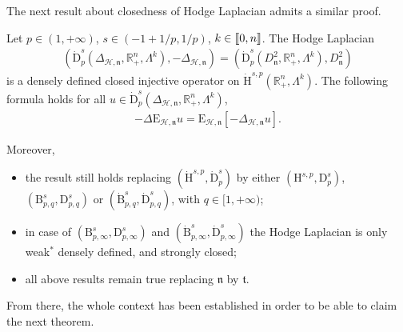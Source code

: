 \documentclass[AHL,Unicode,longabstracts,published]{cedram}
\newcommand{\bbR}{\mathbb{R}}
\newcommand{\rmH}{\mathrm{H}}%
\newcommand{\rmB}{\mathrm{B}}
\newcommand{\rmD}{\mathrm{D}}
\newcommand{\rmE}{\mathrm{E}}
\newcommand{\clH}{\mathcal{H}}
\newcommand{\fkn}{\mathfrak{n}}
\newcommand{\fkt}{\mathfrak{t}}
\newcommand{\llbracket}{\mathopen{[\mkern -2.7mu[}}
\newcommand{\rrbracket}{\mathclose{]\mkern -2.7mu]}}
\newcommand{\llb}{\llbracket}
\newcommand{\rrb}{\rrbracket}
\begin{document}
The next result about closedness of Hodge Laplacian admits a similar proof.

\begin{prop}\label{prop:ExtOpHodgeLapRn+}
Let $p\in(1,+\infty)$, $s\in(-1+1/p,1/p)$, $k\in\llb 0,n \rrb$. The Hodge Laplacian
\begin{align*}
\left(\dot{\rmD}^{s}_{p}\left(\Delta_{\clH,\fkn},\bbR^n_+,\Lambda^k\right),-\Delta_{\clH,\fkn}\right)=\left(\dot{\rmD}^{s}_{p}\left(D_\fkn^2,\bbR^n_+,\Lambda^k\right),D_\fkn^2\right)
\end{align*}
is a densely defined closed injective operator on $\dot{\rmH}^{s,p}(\bbR^n_+,\Lambda^k)$. The following formula holds for all $u\in \dot{\rmD}^{s}_{p}(\Delta_{\clH,\fkn},\bbR^n_+,\Lambda^k)$,
\begin{align*}
-\Delta \rmE _{\clH,\fkn} u = \rmE _{\clH,\fkn}\left[-\Delta_{\clH,\fkn} u\right].
\end{align*}

Moreover,
\begin{itemize}
\item the result still holds replacing $(\dot{\rmH}^{s,p},\dot{\rmD}^{s}_{p})$ by either $({\rmH}^{s,p},{\rmD}^{s}_{p})$, $(\rmB^{s}_{p,q},\rmD^{s}_{p,q})$ or $(\dot{\rmB}^{s}_{p,q},\dot{\rmD}^{s}_{p,q})$, with $q\in[1,+\infty)$;

\item in case of $(\rmB^{s}_{p,\infty},\rmD^{s}_{p,\infty})$ and $(\dot{\rmB}^{s}_{p,\infty},\dot{\rmD}^{s}_{p,\infty})$ the Hodge Laplacian is only weak${}^\ast$ densely defined, and strongly closed;

\item all above results remain true replacing $\fkn$ by $\fkt$.
\end{itemize}
\end{prop}


From there, the whole context has been established in order to be able to claim the next theorem.
\end{document}
